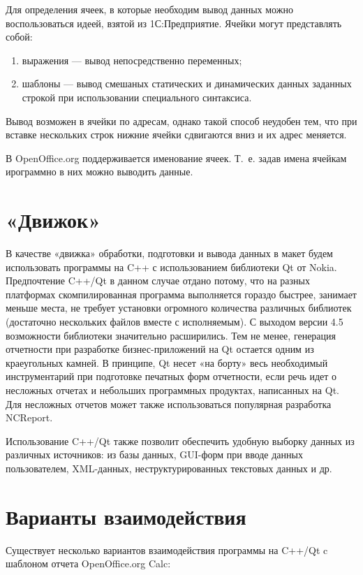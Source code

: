 \documentclass[10pt, a5paper]{article}
\begin{document}
Для определения ячеек, в которые необходим вывод данных можно воспользоваться идеей, взятой из 1С:Предприятие. Ячейки могут представлять собой:
\begin{enumerate}
\item выражения --- вывод непосредственно переменных;
\item шаблоны --- вывод смешаных статических и динамических данных заданных строкой при использовании специального синтаксиса.
\end{enumerate}

Вывод возможен в ячейки по адресам, однако такой способ неудобен тем, что при вставке нескольких строк нижние ячейки сдвигаются вниз и их адрес меняется.

В OpenOffice.org поддерживается именование ячеек. Т. е. задав имена ячейкам ирограммно в них можно выводить данные.

\section*{«Движок»}
В качестве «движка» обработки, подготовки и вывода данных в макет будем использовать программы на C++ с использованием библиотеки Qt от Nokia. Предпочтение C++/Qt в данном случае отдано потому, что на разных платформах скомпилированная программа выполняется гораздо быстрее, занимает меньше места, не требует установки огромного количества различных библиотек (достаточно нескольких файлов вместе с исполняемым).
С выходом версии 4.5 возможности библиотеки значительно расширились. Тем не менее, генерация отчетности при разработке бизнес-приложений на Qt остается одним из краеугольных камней. В принципе, Qt несет «на борту» весь необходимый инструментарий при подготовке печатных форм отчетности, если речь идет о несложных отчетах и небольших программных продуктах, написанных на Qt. Для несложных отчетов может также использоваться популярная разработка NCReport.

Использование C++/Qt также позволит обеспечить удобную выборку данных из различных источников: из базы данных, GUI-форм при вводе данных пользователем, XML-данных, неструктурированных текстовых данных и др.

\section*{Варианты взаимодействия}

Существует несколько вариантов взаимодействия программы на C++/Qt c шаблоном отчета OpenOffice.org Calc:
\end{document}
